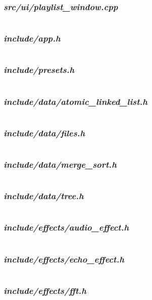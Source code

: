 \subsubsection {\textit{src/ui/playlist\_window.cpp}}
\inputminted[linenos]{c++}{../src/ui/playlist_window.cpp}
\pagebreak
\subsubsection {\textit{include/app.h}}
\inputminted[linenos]{c++}{../include/app.h}
\pagebreak
\subsubsection {\textit{include/presets.h}}
\inputminted[linenos]{c++}{../include/presets.h}
\pagebreak
\subsubsection {\textit{include/data/atomic\_linked\_list.h}}
\inputminted[linenos]{c++}{../include/data/atomic_linked_list.h}
\pagebreak
\subsubsection {\textit{include/data/files.h}}
\inputminted[linenos]{c++}{../include/data/files.h}
\pagebreak
\subsubsection {\textit{include/data/merge\_sort.h}}
\inputminted[linenos]{c++}{../include/data/merge_sort.h}
\pagebreak
\subsubsection {\textit{include/data/tree.h}}
\inputminted[linenos]{c++}{../include/data/tree.h}
\pagebreak
\subsubsection {\textit{include/effects/audio\_effect.h}}
\inputminted[linenos]{c++}{../include/effects/audio_effect.h}
\pagebreak
\subsubsection {\textit{include/effects/echo\_effect.h}}
\inputminted[linenos]{c++}{../include/effects/echo_effect.h}
\pagebreak
\subsubsection {\textit{include/effects/fft.h}}
\inputminted[linenos]{c++}{../include/effects/fft.h}
\pagebreak
